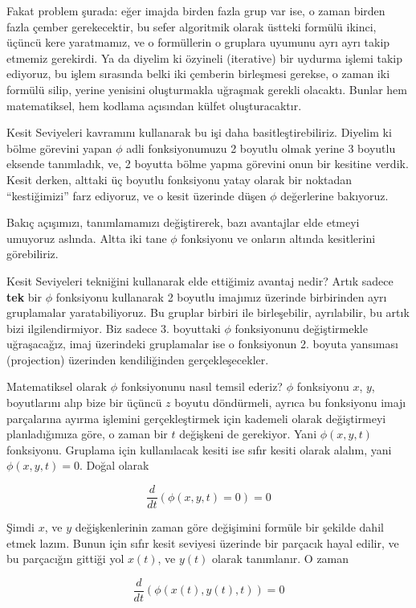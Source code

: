 \documentclass[12pt,fleqn]{article}\usepackage{../../common}
\begin{document}
Fakat problem şurada: eğer imajda birden fazla grup var ise, o zaman
birden fazla çember gerekecektir, bu sefer algoritmik olarak üstteki
formülü ikinci, üçüncü kere yaratmamız, ve o formüllerin o gruplara
uyumunu ayrı ayrı takip etmemiz gerekirdi. Ya da diyelim ki özyineli
(iterative) bir uydurma işlemi takip ediyoruz, bu işlem sırasında
belki iki çemberin birleşmesi gerekse, o zaman iki formülü silip,
yerine yenisini oluşturmakla uğraşmak gerekli olacaktı. Bunlar hem
matematiksel, hem kodlama açısından külfet oluşturacaktır.

Kesit Seviyeleri kavramını kullanarak bu işi daha
basitleştirebiliriz. Diyelim ki bölme görevini yapan $\phi$ adli
fonksiyonumuzu 2 boyutlu olmak yerine 3 boyutlu eksende tanımladık,
ve, 2 boyutta bölme yapma görevini onun bir kesitine verdik. Kesit
derken, alttaki üç boyutlu fonksiyonu yatay olarak bir noktadan
``kestiğimizi'' farz ediyoruz, ve o kesit üzerinde düşen $\phi$
değerlerine bakıyoruz.

Bakıç açışımızı, tanımlamamızı değiştirerek, bazı avantajlar elde
etmeyi umuyoruz aslında. Altta iki tane $\phi$ fonksiyonu ve onların
altında kesitlerini görebiliriz.


Kesit Seviyeleri tekniğini kullanarak elde ettiğimiz avantaj nedir?
Artık sadece \textbf{tek} bir $\phi$ fonksiyonu kullanarak 2 boyutlu
imajımız üzerinde birbirinden ayrı gruplamalar yaratabiliyoruz. Bu
gruplar birbiri ile birleşebilir, ayrılabilir, bu artık bizi
ilgilendirmiyor. Biz sadece 3. boyuttaki $\phi$ fonksiyonunu
değiştirmekle uğraşacağız, imaj üzerindeki gruplamalar ise o
fonksiyonun 2. boyuta yansıması (projection) üzerinden kendiliğinden
gerçekleşecekler.

Matematiksel olarak $\phi$ fonksiyonunu nasıl temsil ederiz? $\phi$
fonksiyonu $x$, $y$, boyutlarını alıp bize bir üçüncü $z$ boyutu
döndürmeli, ayrıca bu fonksiyonu imajı parçalarına ayırma işlemini
gerçekleştirmek için kademeli olarak değiştirmeyi planladığımıza göre,
o zaman bir $t$ değişkeni de gerekiyor. Yani $\phi(x,y,t)$
fonksiyonu. Gruplama için kullanılacak kesiti ise sıfır kesiti olarak
alalım, yani $\phi(x,y,t) = 0$. Doğal olarak

$$ \frac{d}{dt}(\phi(x,y,t) = 0) = 0 $$

Şimdi $x$, ve $y$ değişkenlerinin zaman göre değişimini formüle bir
şekilde dahil etmek lazım. Bunun için sıfır kesit seviyesi üzerinde
bir parçacık hayal edilir, ve bu parçacığın gittiği yol $x(t)$, ve
$y(t)$ olarak tanımlanır. O zaman

$$ \frac{d}{dt}(\phi(x(t),y(t),t)) = 0 $$
\end{document}
